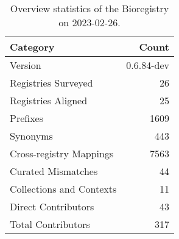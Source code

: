 \begin{table}
\centering
\caption{Overview statistics of the Bioregistry on 2023-02-26.}
\label{tab:bioregistry-summary}
\begin{tabular}{lr}
\toprule
                Category &      Count \\
\midrule
                 Version & 0.6.84-dev \\
     Registries Surveyed &         26 \\
      Registries Aligned &         25 \\
                Prefixes &       1609 \\
                Synonyms &        443 \\
 Cross-registry Mappings &       7563 \\
      Curated Mismatches &         44 \\
Collections and Contexts &         11 \\
     Direct Contributors &         43 \\
      Total Contributors &        317 \\
\bottomrule
\end{tabular}
\end{table}
